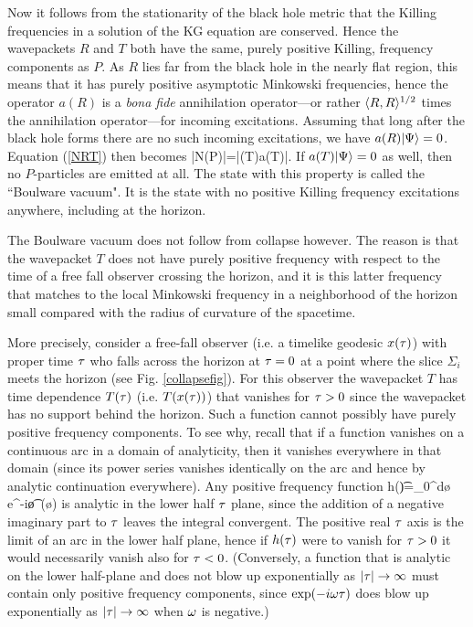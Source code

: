 \documentclass[12pt]{article}
\begin{document}
Now it follows from the stationarity of the black
hole metric that the Killing frequencies in a
solution of the KG equation are conserved.
Hence the 
wavepackets $R$ and $T$
both have the same, purely positive Killing, 
frequency components as $P$. As $R$ lies
far from the black hole in the nearly flat region,
this means that it has purely positive asymptotic
Minkowski frequencies, hence 
the operator $a(R)$ is a {\it bona fide} annihilation
operator---or rather $\langle R,R\rangle^{1/2}$ times the
annihilation operator---for incoming excitations.
Assuming that long after the black hole forms there 
are no such incoming excitations, we have $a(R)|\Psi\rangle=0$.
Equation (\ref{NRT}) then becomes
\beq
\la\Psi|N(P)|\Psi\ra=\la\Psi|\ad(T)a(T)|\Psi\ra.
\label{NT}
\eeq
If $a(T)|\Psi\rangle=0$ as well, then no $P$-particles
are emitted at all. The state with this property is 
called the ``Boulware vacuum". It is the state with no
positive Killing frequency excitations anywhere, including
at the horizon.

The Boulware vacuum 
does not follow from collapse however. 
The reason is that the wavepacket 
$T$ does not have purely
positive frequency with respect to the time of a free fall
observer crossing the horizon, and it is this latter frequency
that matches to the local Minkowski frequency in a
neighborhood of the horizon small compared with 
the radius of curvature of the spacetime.

More precisely,
consider a free-fall observer 
(i.e. a timelike geodesic $x(\tau)$)
with proper time
$\tau$ who falls across the horizon at $\tau=0$ 
at a point where the slice $\Sigma_i$ meets
the horizon (see Fig. \ref{collapsefig}). 
For this observer the wavepacket $T$
has time dependence $T(\tau)$ (i.e. $T(x(\tau))$) that 
vanishes for $\tau>0$ since the wavepacket has no
support behind the horizon. Such a function cannot
possibly have purely positive frequency components.
To see why, recall that if a function vanishes 
on a continuous arc in a domain of analyticity, then
it vanishes everywhere in that domain (since its
power series vanishes identically on the arc
and hence by analytic continuation everywhere).
Any positive frequency function
\beq
h(\t)=\int_0^\infty d\o \, e^{-i\o \t}\,  (\o)
\label{posfreqint}
\eeq
is analytic in the lower half $\tau$ plane, since the addition
of a negative imaginary part to $\tau$ leaves the
integral convergent. The positive real $\tau$ axis
is the limit of an arc in the lower half plane, 
hence if $h(\tau)$ were to vanish for $\tau>0$ it 
would necessarily vanish also for $\tau<0$.
(Conversely, a function that
is analytic on the lower half-plane and
does not blow up exponentially
as $|\tau|\rightarrow\infty$ must contain
only positive frequency components, since 
$\exp(-i\omega \tau)$ does blow up exponentially
as $|\tau|\rightarrow\infty$ when $\omega$ is negative.)
\end{document}
